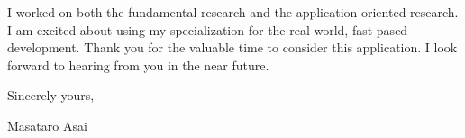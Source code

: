\documentclass[12pt]{letter}
\begin{document}

I worked on both the fundamental research and the application-oriented
research. I am excited about using my specialization for the real
world, fast pased development.
Thank you for the valuable time to consider this application. I look forward to hearing from you in the near future.

Sincerely yours,

\begin{flushright}
 Masataro Asai
\end{flushright}
\end{document}
